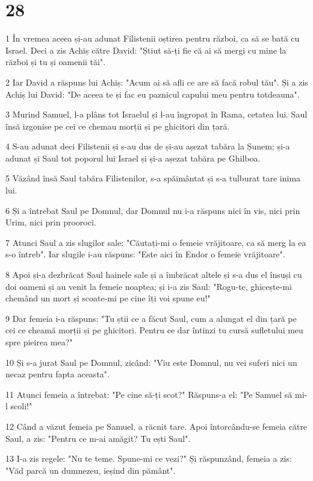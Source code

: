 \chapter{28}

\par 1 În vremea aceea și-au adunat Filistenii oștirea pentru război, ca să se bată cu Israel. Deci a zis Achiș către David: "Știut să-ți fie că ai să mergi cu mine la război și tu și oamenii tăi".
\par 2 Iar David a răspuns lui Achiș: "Acum ai să afli ce are să facă robul tău". Și a zis Achiș lui David: "De aceea te și fac eu paznicul capului meu pentru totdeauna".
\par 3 Murind Samuel, l-a plâns tot Israelul și l-au îngropat în Rama, cetatea lui. Saul însă izgonise pe cei ce chemau morții și pe ghicitori din țară.
\par 4 S-au adunat deci Filistenii și s-au dus de și-au așezat tabăra la Șunem; și-a adunat și Saul tot poporul lui Israel și și-a așezat tabăra pe Ghilboa.
\par 5 Văzând însă Saul tabăra Filistenilor, s-a spăimântat și s-a tulburat tare inima lui.
\par 6 Și a întrebat Saul pe Domnul, dar Domnul nu i-a răspuns nici în vis, nici prin Urim, nici prin prooroci.
\par 7 Atunci Saul a zis slugilor sale: "Căutați-mi o femeie vrăjitoare, ca să merg la ea s-o întreb". Iar slugile i-au răspuns: "Este aici în Endor o femeie vrăjitoare".
\par 8 Apoi și-a dezbrăcat Saul hainele sale și a îmbrăcat altele și s-a dus el însuși cu doi oameni și au venit la femeie noaptea; și i-a zis Saul: "Rogu-te, ghicește-mi chemând un mort și scoate-mi pe cine îți voi spune eu!"
\par 9 Dar femeia i-a răspuns: "Tu știi ce a făcut Saul, cum a alungat el din țară pe cei ce cheamă morții și pe ghicitori. Pentru ce dar întinzi tu cursă sufletului meu spre pieirea mea?"
\par 10 Și s-a jurat Saul pe Domnul, zicând: "Viu este Domnul, nu vei suferi nici un necaz pentru fapta aceasta".
\par 11 Atunci femeia a întrebat: "Pe cine să-ți scot?" Răspuns-a el: "Pe Samuel să mi-l scoli!"
\par 12 Când a văzut femeia pe Samuel, a răcnit tare. Apoi întorcându-se femeia către Saul, a zis: "Pentru ce m-ai amăgit? Tu ești Saul".
\par 13 I-a zis regele: "Nu te teme. Spune-mi ce vezi?" Și răspunzând, femeia a zis: "Văd parcă un dumnezeu, ieșind din pământ".
